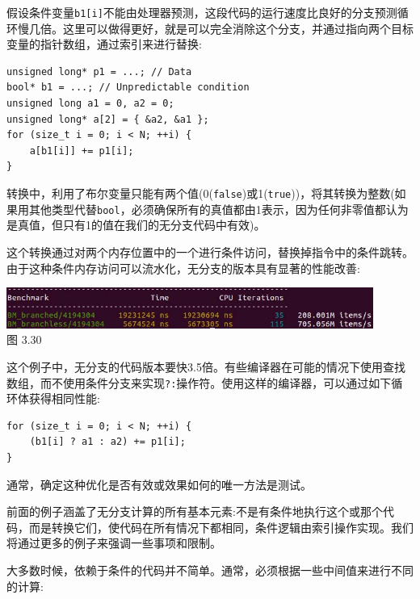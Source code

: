 假设条件变量\texttt{b1[i]}不能由处理器预测，这段代码的运行速度比良好的分支预测循环慢几倍。这里可以做得更好，就是可以完全消除这个分支，并通过指向两个目标变量的指针数组，通过索引来进行替换:

\begin{lstlisting}[style=styleCXX]
unsigned long* p1 = ...; // Data
bool* b1 = ...; // Unpredictable condition
unsigned long a1 = 0, a2 = 0;
unsigned long* a[2] = { &a2, &a1 };
for (size_t i = 0; i < N; ++i) {
	a[b1[i]] += p1[i];
}
\end{lstlisting}

转换中，利用了布尔变量只能有两个值(0(\texttt{false})或1(\texttt{true}))，将其转换为整数(如果用其他类型代替\texttt{bool}，必须确保所有的真值都由1表示，因为任何非零值都认为是真值，但只有1的值在我们的无分支代码中有效)。

这个转换通过对两个内存位置中的一个进行条件访问，替换掉指令中的条件跳转。由于这种条件内存访问可以流水化，无分支的版本具有显著的性能改善:

\begin{center}
\includegraphics[width=0.9\textwidth]{content/1/chapter3/images/30.jpg}\\
图 3.30
\end{center}

这个例子中，无分支的代码版本要快3.5倍。有些编译器在可能的情况下使用查找数组，而不使用条件分支来实现\texttt{?:}操作符。使用这样的编译器，可以通过如下循环体获得相同性能:

\begin{lstlisting}[style=styleCXX]
for (size_t i = 0; i < N; ++i) {
	(b1[i] ? a1 : a2) += p1[i];
}
\end{lstlisting}

通常，确定这种优化是否有效或效果如何的唯一方法是测试。

前面的例子涵盖了无分支计算的所有基本元素:不是有条件地执行这个或那个代码，而是转换它们，使代码在所有情况下都相同，条件逻辑由索引操作实现。我们将通过更多的例子来强调一些事项和限制。


大多数时候，依赖于条件的代码并不简单。通常，必须根据一些中间值来进行不同的计算:

